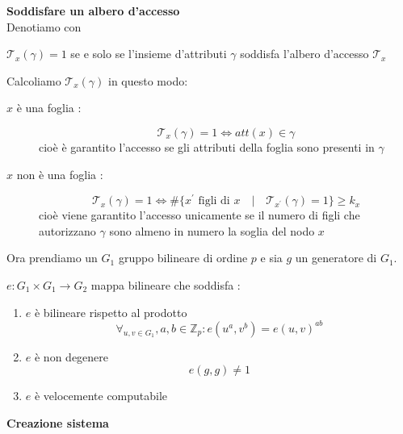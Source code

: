 \textbf{ \large Soddisfare un albero d'accesso}\\[0.1cm]
Denotiamo con 
\begin{center}
$\mathcal{T}_x(\gamma) = 1$ se e solo se l'insieme d'attributi $\gamma$ soddisfa l'albero d'accesso $\mathcal{T}_x$
\end{center}
Calcoliamo $\mathcal{T}_x(\gamma)$ in questo modo:
\begin{description}
\item[$x$ è una foglia :] \[\mathcal{T}_x(\gamma) = 1 \Leftrightarrow att(x) \in \gamma\]
cioè è garantito l'accesso se gli attributi della foglia sono presenti in $\gamma$
\item[$x$ non è una foglia :] \[\mathcal{T}_x(\gamma) = 1  \Leftrightarrow \# \{x^\prime \text{ figli di } x \quad|\quad \mathcal{T}_{x^\prime}(\gamma) = 1  \} \geq k_x\]
cioè viene garantito l'accesso unicamente se il numero di figli che autorizzano $\gamma$ sono almeno in numero la soglia del nodo $x$ 
\end{description}

\vspace{0.8cm}

Ora prendiamo un $G_1$ gruppo bilineare di ordine $p$ e sia $g$ un generatore di $G_1$.\\
\begin{defi}\label{pairinge}
$e : G_1 \times G_1 \rightarrow G_2$ mappa bilineare che soddisfa :
\begin{enumerate}
\item $e$ è bilineare rispetto al prodotto
\[ \forall_{u,v \in G_1}, a,b \in \mathbb{Z}_p : e(u^a,v^b) = e(u,v)^{ab} \]
\item $e$ è non degenere \[e(g,g) \neq 1\]
\item $e$ è velocemente computabile
\end{enumerate}
\end{defi}

\vspace{0.8cm}

\textbf{\Large Creazione sistema}

